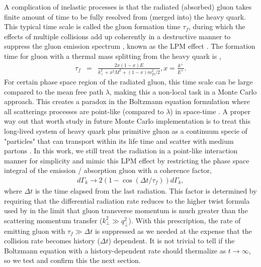 \documentclass[aps, prc, reprint, amsmath, groupedaddress, nofootinbib]{revtex4-1}
\begin{document}
A complication of inelastic processes is that the radiated (absorbed) gluon takes finite amount of time to be fully resolved from (merged into) the heavy quark.
This typical time scale is called the gluon formation time $\tau_f$, during which the effects of multiple collisions add up coherently in a destructive manner to suppress the gluon emission spectrum \cite{Wang:1994fx, Baier:1996kr, Zakharov:1996fv}, known as the LPM effect \cite{PhysRev.103.1811}.
The formation time for gluon with a thermal mass splitting from the heavy quark is \cite{Cao:2013ita},
\begin{eqnarray}
\tau_f &=& \frac{2x(1-x)E}{k_\perp^2 + x^2M^2 + (1-x)m_D^2/2}, x = \frac{k^+}{E^+}.
\end{eqnarray}
For certain phase space region of the radiated gluon, this time scale can be large compared to the mean free path $\lambda$, making this a non-local task in a Monte Carlo approach.
This creates a paradox in the Boltzmann equation formulation where all scatterings processes are point-like (compared to $\lambda$) in space-time  .
A proper way out that worth study in future Monte Carlo implementation is to treat this long-lived system of heavy quark plus primitive gluon as a continuum specie of "particles" that can transport within its life time and scatter with medium partons \cite{ColemanSmith:2012vr}.
In this work, we still treat the radiation in a point-like interaction manner for simplicity and mimic this LPM effect by restricting the phase space integral of the emission / absorption gluon with a coherence factor,
\begin{eqnarray}\label{eq:LPM}
d\Gamma_k \rightarrow 2\left(1 - \cos\left(\Delta t/\tau_f\right) \right)d\Gamma_k,
\end{eqnarray}
where $\Delta t$ is the time elapsed from the last radiation.
This factor is determined by requiring that the differential radiation rate reduces to the higher twist formula used by \cite{Cao:2013ita} in the limit that gluon transverse momentum is much greater than the scattering momentum transfer ($k_\perp^2 \gg q_\perp^2$).
With this prescription, the rate of emitting gluon with $\tau_f \gg \Delta t$ is suppressed as we needed at the expense that the collision rate becomes history ($\Delta t$) dependent.
It is not trivial to tell if the Boltzmann equation with a history-dependent rate should thermalize as $t\rightarrow \infty$, so we test and confirm this the next section.
\end{document}
